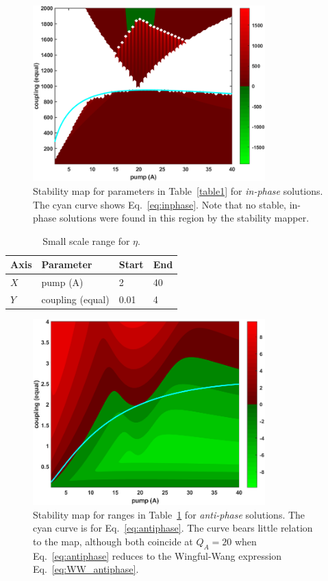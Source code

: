 \documentclass[a4paper,12pt]{article}
\begin{document}
\begin{figure}[h!]
\centering 
\includegraphics[width=0.8\textwidth]{Eq_10_inphase_QB_20.png}
\caption{Stability map for parameters in Table~\ref{table1} for \emph{in-phase} solutions. The cyan curve shows Eq.~\eqref{eq:inphase}. Note that no stable, in-phase solutions were found in this region by the stability mapper.}
\end{figure}


\begin{table}[h!]
\centering 
\begin{tabular}{llll}
Axis & Parameter & Start & End \\
\hline
$X$ & pump (A) & 2 & 40  \\ 
$Y$ & coupling (equal) & 0.01 & 4  \\ 
\hline
\end{tabular}

\caption{Small scale range for $\eta$.}\label{table2}

\end{table}

\begin{figure}[h!]
\centering 
\includegraphics[width=0.8\textwidth]{Eq_10_antiphase_small_QB_20.png}
\caption{Stability map for ranges in Table~\ref{table2} for \emph{anti-phase} solutions. The cyan curve is for Eq.~\eqref{eq:antiphase}. The curve bears little relation to the map, although both coincide at $Q_{A} = 20$ when Eq.~\eqref{eq:antiphase} reduces to the Wingful-Wang expression Eq.~\eqref{eq:WW_antiphase}.}
\end{figure}




%
%
\end{document}
